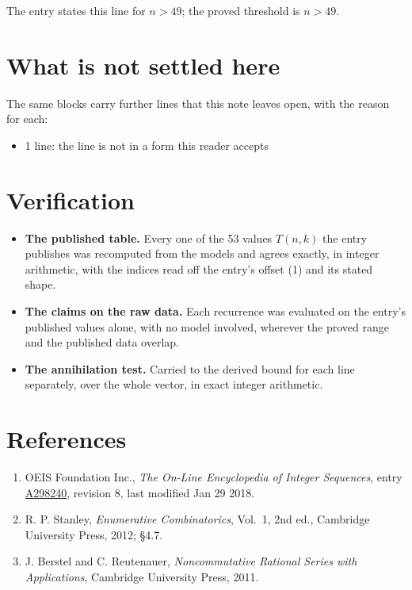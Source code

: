 \documentclass[11pt]{article}
\theoremstyle{definition}
\begin{document}
The entry states this line for $n > 49$; the proved threshold is $n > 49$.

\section{What is not settled here}

The same blocks carry further lines that this note leaves open, with the reason for each:

\begin{itemize}

\item 1 line: the line is not in a form this reader accepts

\end{itemize}

\section{Verification}

\begin{itemize}

\item {\bfseries The published table.} Every one of the 53 values $T(n,k)$ the entry publishes was recomputed from the models and agrees exactly, in integer arithmetic, with the indices read off the entry's offset (1) and its stated shape.

\item {\bfseries The claims on the raw data.} Each recurrence was evaluated on the entry's published values alone, with no model involved, wherever the proved range and the published data overlap.

\item {\bfseries The annihilation test.} Carried to the derived bound for each line separately, over the whole vector, in exact integer arithmetic.

\end{itemize}

\section{References}

\begin{enumerate}

\item OEIS Foundation Inc., \emph{The On-Line Encyclopedia of Integer Sequences}, entry \href{https://oeis.org/A298240}{A298240}, revision 8, last modified Jan 29 2018.

\item R. P. Stanley, \emph{Enumerative Combinatorics}, Vol.~1, 2nd ed., Cambridge University Press, 2012; \S4.7.

\item J. Berstel and C. Reutenauer, \emph{Noncommutative Rational Series with Applications}, Cambridge University Press, 2011.

\end{enumerate}
\end{document}
